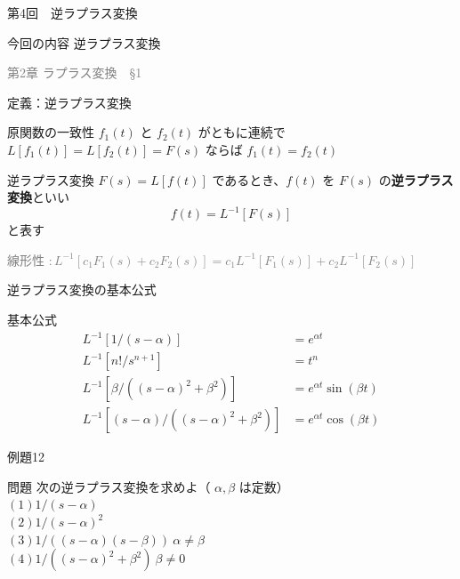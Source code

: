 \documentclass[professionalfonts]{beamer}
\begin{document}
\begin{frame}{第4回　逆ラプラス変換}
  \begin{block}{今回の内容}
  逆ラプラス変換
  \end{block}
  \vfill\hfill{\scriptsize \textcolor{gray}{第2章 ラプラス変換　§1}}
\end{frame}

\begin{frame}{定義：逆ラプラス変換}
  \begin{block}{原関数の一致性}
  $f_{1}(t)$ と $f_{2}(t)$ がともに連続で $L[f_{1}(t)] = L[f_{2}(t)] = F(s)$ ならば $f_{1}(t) = f_{2}(t)$
  \end{block}
  \begin{block}{逆ラプラス変換}
  $F(s) = L[f(t)]$ であるとき、$f(t)$ を $F(s)$ の\textbf{逆ラプラス変換}といい
  \[
    f(t) = L^{-1}[F(s)]
  \]
  と表す
  \end{block}
  {\footnotesize \textcolor{gray}{線形性 $: L^{-1}[c_{1}F_{1}(s)+c_{2}F_{2}(s)] = c_{1}L^{-1}[F_{1}(s)]+c_{2}L^{-1}[F_{2}(s)]$}}
\end{frame}

\begin{frame}{逆ラプラス変換の基本公式}
  \begin{block}{基本公式}
  \begin{align*}
    L^{-1}[1/(s-\alpha)] &= e^{\alpha t} \\
    L^{-1}[n!/s^{n+1}] &= t^n \\
    L^{-1}[\beta/((s-\alpha)^{2}+\beta^{2})] &= e^{\alpha t}\sin(\beta t) \\
    L^{-1}[(s-\alpha)/((s-\alpha)^{2}+\beta^{2})] &= e^{\alpha t}\cos(\beta t)
  \end{align*}
  \end{block}
\end{frame}

\begin{frame}{例題12}
  \begin{exampleblock}{問題}
    次の逆ラプラス変換を求めよ（ $\alpha, \beta$ は定数）\\[2pt]
    $(1) 1/(s-\alpha)$\\[2pt]
    $(2) 1/(s-\alpha)^{2}$\\[2pt]
    $(3) 1/((s-\alpha)(s-\beta)) \ \alpha \neq \beta$\\[2pt]
    $(4) 1/((s-\alpha)^{2}+\beta^{2}) \ \beta \neq 0$\\[2pt]
  \end{exampleblock}
\end{frame}
\end{document}
